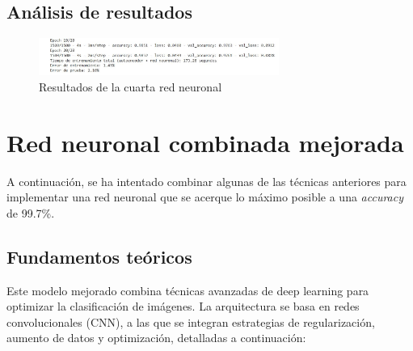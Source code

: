 \subsection{Análisis de resultados}

\begin{figure}[H]
	\centering
	\includegraphics[width=0.7\textwidth]{imgs/results-red4.JPG}
	\caption{Resultados de la cuarta red neuronal}
	\label{fig:results-red4}
\end{figure}



\section{Red neuronal combinada mejorada}

A continuación, se ha intentado combinar algunas de las técnicas anteriores para implementar una red neuronal que se acerque lo máximo posible a una \textit{accuracy} de 99.7\%.

\subsection{Fundamentos teóricos}

Este modelo mejorado combina técnicas avanzadas de deep learning para optimizar la clasificación de imágenes. La arquitectura se basa en redes convolucionales (CNN), a las que se integran estrategias de regularización, aumento de datos y optimización, detalladas a continuación:

